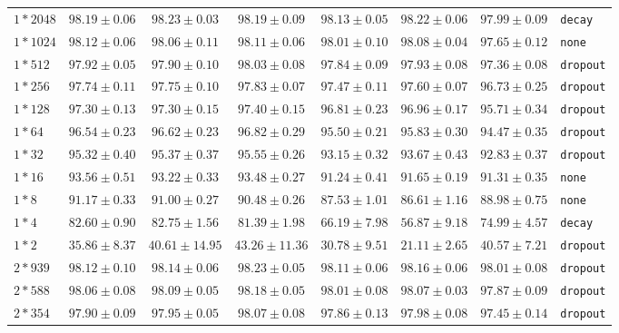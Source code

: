 \documentclass[conference]{IEEEtran}
\begin{document}
\begin{longtable}{@{}lccccccl@{}}
$1*2048$ & $98.19 \pm 0.06$ & \bfseries $98.23 \pm 0.03$ & $98.19 \pm 0.09$ & $98.13 \pm 0.05$ & $98.22 \pm 0.06$ & $97.99 \pm 0.09$ & \texttt{decay} \\
$1*1024$ & \bfseries $98.12 \pm 0.06$ & $98.06 \pm 0.11$ & $98.11 \pm 0.06$ & $98.01 \pm 0.10$ & $98.08 \pm 0.04$ & $97.65 \pm 0.12$ & \texttt{none} \\
$1*512$ & $97.92 \pm 0.05$ & $97.90 \pm 0.10$ & \bfseries $98.03 \pm 0.08$ & $97.84 \pm 0.09$ & $97.93 \pm 0.08$ & $97.36 \pm 0.08$ & \texttt{dropout} \\
$1*256$ & $97.74 \pm 0.11$ & $97.75 \pm 0.10$ & \bfseries $97.83 \pm 0.07$ & $97.47 \pm 0.11$ & $97.60 \pm 0.07$ & $96.73 \pm 0.25$ & \texttt{dropout} \\
$1*128$ & $97.30 \pm 0.13$ & $97.30 \pm 0.15$ & \bfseries $97.40 \pm 0.15$ & $96.81 \pm 0.23$ & $96.96 \pm 0.17$ & $95.71 \pm 0.34$ & \texttt{dropout} \\
$1*64$ & $96.54 \pm 0.23$ & $96.62 \pm 0.23$ & \bfseries $96.82 \pm 0.29$ & $95.50 \pm 0.21$ & $95.83 \pm 0.30$ & $94.47 \pm 0.35$ & \texttt{dropout} \\
$1*32$ & $95.32 \pm 0.40$ & $95.37 \pm 0.37$ & \bfseries $95.55 \pm 0.26$ & $93.15 \pm 0.32$ & $93.67 \pm 0.43$ & $92.83 \pm 0.37$ & \texttt{dropout} \\
$1*16$ & \bfseries $93.56 \pm 0.51$ & $93.22 \pm 0.33$ & $93.48 \pm 0.27$ & $91.24 \pm 0.41$ & $91.65 \pm 0.19$ & $91.31 \pm 0.35$ & \texttt{none} \\
$1*8$ & \bfseries $91.17 \pm 0.33$ & $91.00 \pm 0.27$ & $90.48 \pm 0.26$ & $87.53 \pm 1.01$ & $86.61 \pm 1.16$ & $88.98 \pm 0.75$ & \texttt{none} \\
$1*4$ & $82.60 \pm 0.90$ & \bfseries $82.75 \pm 1.56$ & $81.39 \pm 1.98$ & $66.19 \pm 7.98$ & $56.87 \pm 9.18$ & $74.99 \pm 4.57$ & \texttt{decay} \\
$1*2$ & $35.86 \pm 8.37$ & $40.61 \pm 14.95$ & \bfseries $43.26 \pm 11.36$ & $30.78 \pm 9.51$ & $21.11 \pm 2.65$ & $40.57 \pm 7.21$ & \texttt{dropout} \\
$2*939$ & $98.12 \pm 0.10$ & $98.14 \pm 0.06$ & \bfseries $98.23 \pm 0.05$ & $98.11 \pm 0.06$ & $98.16 \pm 0.06$ & $98.01 \pm 0.08$ & \texttt{dropout} \\
$2*588$ & $98.06 \pm 0.08$ & $98.09 \pm 0.05$ & \bfseries $98.18 \pm 0.05$ & $98.01 \pm 0.08$ & $98.07 \pm 0.03$ & $97.87 \pm 0.09$ & \texttt{dropout} \\
$2*354$ & $97.90 \pm 0.09$ & $97.95 \pm 0.05$ & \bfseries $98.07 \pm 0.08$ & $97.86 \pm 0.13$ & $97.98 \pm 0.08$ & $97.45 \pm 0.14$ & \texttt{dropout} \\

\end{longtable}
\end{document}
